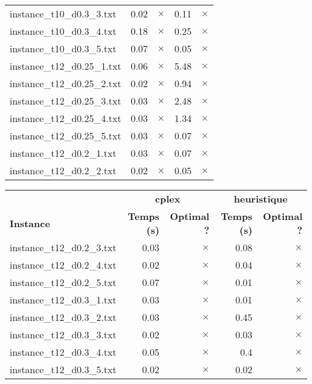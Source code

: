 \documentclass{article}
\begin{document}
\begin{center}
\begin{tabular}{lrrrr}
instance\_t10\_d0.3\_3.txt & 0.02 & 
$\times$
 & 0.11 & 
$\times$
\\
instance\_t10\_d0.3\_4.txt & 0.18 & 
$\times$
 & 0.25 & 
$\times$
\\
instance\_t10\_d0.3\_5.txt & 0.07 & 
$\times$
 & 0.05 & 
$\times$
\\
instance\_t12\_d0.25\_1.txt & 0.06 & 
$\times$
 & 5.48 & 
$\times$
\\
instance\_t12\_d0.25\_2.txt & 0.02 & 
$\times$
 & 0.94 & 
$\times$
\\
instance\_t12\_d0.25\_3.txt & 0.03 & 
$\times$
 & 2.48 & 
$\times$
\\
instance\_t12\_d0.25\_4.txt & 0.03 & 
$\times$
 & 1.34 & 
$\times$
\\
instance\_t12\_d0.25\_5.txt & 0.03 & 
$\times$
 & 0.07 & 
$\times$
\\
instance\_t12\_d0.2\_1.txt & 0.03 & 
$\times$
 & 0.07 & 
$\times$
\\
instance\_t12\_d0.2\_2.txt & 0.02 & 
$\times$
 & 0.05 & 
$\times$
\\
\hline\end{tabular}
\end{center}

\newpage
\begin{center}
\renewcommand{\arraystretch}{1.4} 
 \begin{tabular}{lrrrr}
	\hline
 & \multicolumn{2}{c}{\textbf{cplex}} & \multicolumn{2}{c}{\textbf{heuristique}}\\
\textbf{Instance}  & \textbf{Temps (s)} & \textbf{Optimal ?}  & \textbf{Temps (s)} & \textbf{Optimal ?} \\\hline

instance\_t12\_d0.2\_3.txt & 0.03 & 
$\times$
 & 0.08 & 
$\times$
\\
instance\_t12\_d0.2\_4.txt & 0.02 & 
$\times$
 & 0.04 & 
$\times$
\\
instance\_t12\_d0.2\_5.txt & 0.07 & 
$\times$
 & 0.01 & 
$\times$
\\
instance\_t12\_d0.3\_1.txt & 0.03 & 
$\times$
 & 0.01 & 
$\times$
\\
instance\_t12\_d0.3\_2.txt & 0.03 & 
$\times$
 & 0.45 & 
$\times$
\\
instance\_t12\_d0.3\_3.txt & 0.02 & 
$\times$
 & 0.03 & 
$\times$
\\
instance\_t12\_d0.3\_4.txt & 0.05 & 
$\times$
 & 0.4 & 
$\times$
\\
instance\_t12\_d0.3\_5.txt & 0.02 & 
$\times$
 & 0.02 & 
$\times$
\\
\hline\end{tabular}
\end{center}
\end{document}
